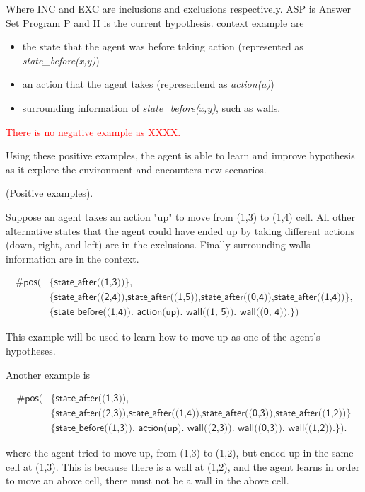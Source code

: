 Where INC and EXC are inclusions and exclusions respectively. ASP is Answer Set Program P and H is the current hypothesis. 
context example are
\begin{itemize}
    \item the state that the agent was before taking action (represented as \textit{state\_before(x,y)})
    \item an action that the agent takes (representend as \textit{action(a)})
    \item surrounding information of \textit{state\_before(x,y)}, such as walls. 
\end{itemize}
\textcolor{red}{There is no negative example as XXXX.}

Using these positive examples, the agent is able to learn and improve hypothesis as it explore the environment and encounters new scenarios. 

\begin{examp} \normalfont (Positive examples). 

Suppose an agent takes an action "up" to move from (1,3) to (1,4) cell. All other alternative states that the agent could have ended up by taking different actions 
(down, right, and left) are in the exclusions. Finally surrounding walls information are in the context.

\begin{equation*}
\begin{split}
    \textsf{\#pos(} & \textsf{\{state\_after((1,3))\},}\\
                    & \textsf{\{state\_after((2,4)),state\_after((1,5)),state\_after((0,4)),state\_after((1,4))\},} \\
    & \textsf{\{state\_before((1,4)). action(up). wall((1, 5)). wall((0, 4)).\})}
\end{split}
\end{equation*}

This example will be used to learn how to move up as one of the agent's hypotheses.

Another example is 

\begin{equation*}
\begin{split}
\textsf{\#pos(} & \textsf{\{state\_after((1,3))}, \\ 
                & \textsf{\{state\_after((2,3)),state\_after((1,4)),state\_after((0,3)),state\_after((1,2))\}} \\       
                & \textsf{\{state\_before((1,3)). action(up). wall((2,3)). wall((0,3)). wall((1,2)).\}).}
\end{split}
\end{equation*}


where the agent tried to move up, from (1,3) to (1,2), but ended up in the same cell at (1,3). This is because there is a wall at (1,2), and the agent learns in order to move an above cell,
there must not be a wall in the above cell. 

\end{examp}
\label{state_transition_example}

